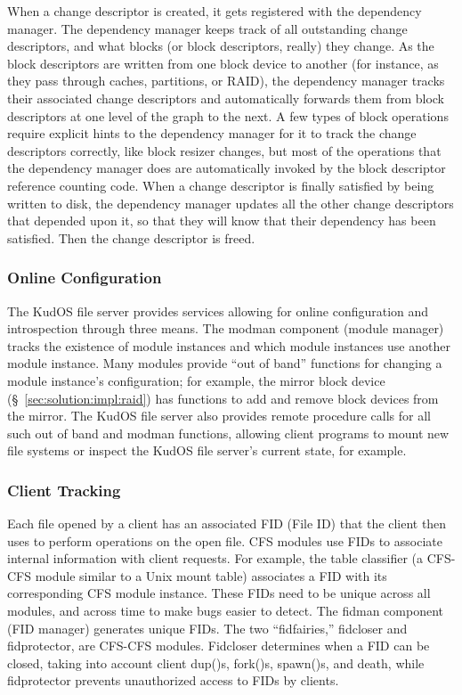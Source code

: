When a change descriptor is created, it gets registered with the dependency
manager. The dependency manager keeps track of all outstanding change
descriptors, and what blocks (or block descriptors, really) they change. As the
block descriptors are written from one block device to another (for instance, as
they pass through caches, partitions, or RAID), the dependency manager tracks
their associated change descriptors and automatically forwards them from block
descriptors at one level of the graph to the next. A few types of block
operations require explicit hints to the dependency manager for it to track the
change descriptors correctly, like block resizer changes, but most of the
operations that the dependency manager does are automatically invoked by the
block descriptor reference counting code. When a change descriptor is finally
satisfied by being written to disk, the dependency manager updates all the other
change descriptors that depended upon it, so that they will know that their
dependency has been satisfied. Then the change descriptor is freed.

\subsubsection{Online Configuration}
\label{sec:solution:arch:online}


The KudOS file server provides services allowing for online configuration and
introspection through three means. The modman component (module manager)
tracks the existence of module instances and which module instances use
another module instance. Many modules provide ``out of band'' functions for
changing a module instance's configuration; for example, the mirror block
device (\S~\ref{sec:solution:impl:raid}) has functions to add and remove block
devices from the mirror. The KudOS file server also provides remote procedure
calls for all such out of band and modman functions, allowing client programs
to mount new file systems or inspect the KudOS file server's current state,
for example.

\subsubsection{Client Tracking}
\label{sec:solution:arch:clients}

Each file opened by a client has an associated FID (File ID) that the client
then uses to perform operations on the open file. CFS modules use FIDs to
associate internal information with client requests. For example, the table
classifier (a CFS-CFS module similar to a Unix mount table) associates a FID
with its corresponding CFS module instance. These FIDs need to be unique across
all modules, and across time to make bugs easier to detect. The fidman component
(FID manager) generates unique FIDs. The two ``fidfairies,'' fidcloser and
fidprotector, are CFS-CFS modules. Fidcloser determines when a FID can be
closed, taking into account client dup()s, fork()s, spawn()s, and death, while
fidprotector prevents unauthorized access to FIDs by clients.
